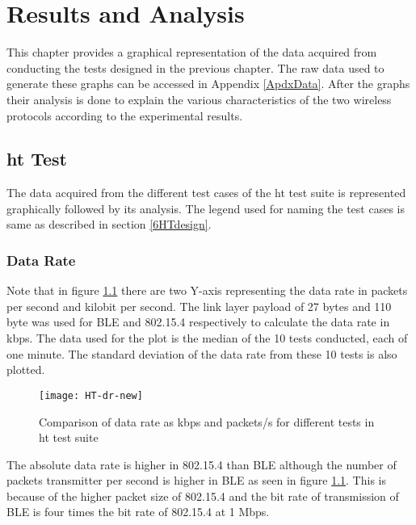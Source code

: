 \chapter{Results and Analysis} \label{7ResultsAnalysis}
This chapter provides a graphical representation of the data acquired from conducting the tests designed in the previous chapter. The raw data used to generate these graphs can be accessed in Appendix \ref{ApdxData}. After the graphs their analysis is done to explain the various characteristics of the two wireless protocols according to the experimental results.

\section{\texorpdfstring{\acrlong{ht}}{High-Throughput} Test}
The data acquired from the different test cases of the \gls{ht} test suite is represented graphically followed by its analysis. The legend used for naming the test cases is same as described in section \ref{6HTdesign}.

\subsection{Data Rate}

Note that in figure \ref{fig:HT-dr} there are two Y-axis representing the data rate in packets per second and kilobit per second. The link layer payload of 27 bytes and 110 byte was used for BLE and 802.15.4 respectively to calculate the data rate in kbps. The data used for the plot is the median of the 10 tests conducted, each of one minute. The standard deviation of the data rate from these 10 tests is also plotted. 
\begin{figure}[tb]
\texttt{[image: HT-dr-new]}
\caption{Comparison of data rate as kbps and packets/s for different tests in \gls{ht} test suite}
\label{fig:HT-dr}

\end{figure}

The absolute data rate is higher in 802.15.4 than BLE although the number of packets transmitter per second is higher in BLE as seen in figure \ref{fig:HT-dr}. This is because of the higher packet size of 802.15.4 and the bit rate of transmission of BLE is four times the bit rate of 802.15.4 at 1 Mbps.

